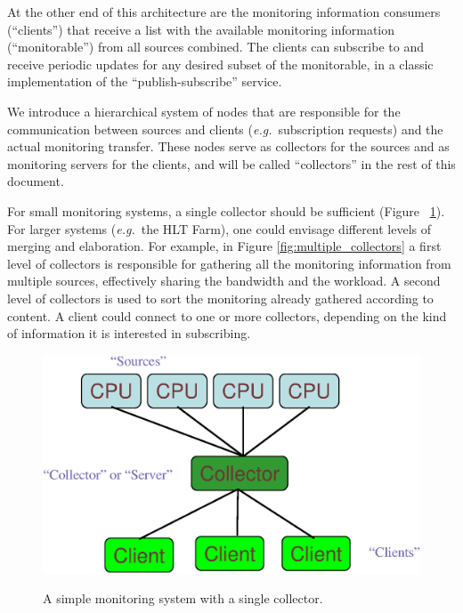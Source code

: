\documentclass{cmspaper}
\newcommand {\eg}{\mbox{\sl e.g. }}     %
\begin{document}
At the other end of this architecture are the monitoring information
consumers (``clients'') that receive a list with the available monitoring
information (``monitorable'') from all sources combined. The clients can
subscribe to and receive periodic updates for any desired subset of the
monitorable, in a classic implementation of the ``publish-subscribe'' service.

We introduce a hierarchical system of nodes that are responsible for
the communication between sources and clients (\eg subscription
requests) and the actual monitoring transfer. These nodes serve as
collectors for the sources and as monitoring servers for the clients,
and will be called ``collectors'' in the rest of this document.

For small monitoring systems, a single collector should be
sufficient (Figure ~\ref{fig:single_collector}). For larger systems
(\eg the HLT Farm), one could envisage different levels of merging
and elaboration. For example, in Figure \ref{fig:multiple_collectors}
a first level of collectors is responsible for gathering all the
monitoring information from multiple sources, effectively sharing the
bandwidth and the workload. A second level of collectors is used to
sort the monitoring already gathered according to content. A client
could connect to one or more collectors, depending on the kind of
information it is interested in subscribing.
%
\begin{figure}[hbtp]
  \begin{center}
    \resizebox{10cm}{!}
	{\includegraphics{figures/single_collector.eps}} 
\caption{A simple monitoring system with a single collector.}
\label{fig:single_collector}
  \end{center}
\end{figure}
%
\end{document}
